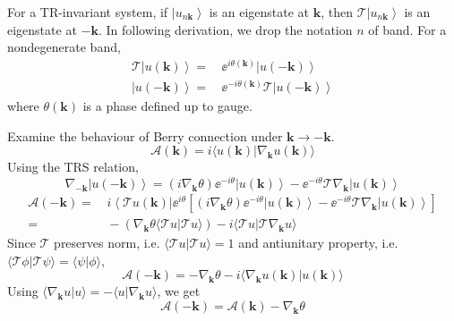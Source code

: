 \documentclass[12pt,a4paper]{article}
\newcommand{\bra}[1]{\left\langle{#1}\right|}
\newcommand{\ket}[1]{\left|{#1}\right\rangle}
\newcommand{\braket}[2]{\langle{#1}|{#2}\rangle}
\begin{document}
    For a TR-invariant system, if $\ket{u_{n\mathbf{k}}}$ is an eigenstate at $\mathbf{k}$, then $\mathcal{T}\ket{u_{n\mathbf{k}}}$ is an eigenstate at $-\mathbf{k}$. In following derivation, we drop the notation $n$ of band. For a nondegenerate band,
    \[\begin{aligned}
        \mathcal{T}\ket{u(\mathbf{k})}
        = &\, \ee^{i\theta(\mathbf{k})} \ket{u(\mathbf{-k})} \\
        \ket{u(\mathbf{-k})}
        = &\, \ee^{-i\theta(\mathbf{k})} \mathcal{T}\ket{u(\mathbf{-k})}
    \end{aligned}\]
    where $\theta(\mathbf{k})$ is a phase defined up to gauge.

    Examine the behaviour of Berry connection under \(\mathbf{k}\to -\mathbf{k}\).
    \[
        \mathcal{A}(\mathbf{k})
        = i \braket{u(\mathbf{k})}{\nabla_\mathbf{k}u(\mathbf{k})}
    \]
    Using the TRS relation,
    \[
        \nabla_{-\mathbf{k}} \ket{u(\mathbf{-k})}
        = \left(i\nabla_\mathbf{k}\theta\right) \ee^{-i\theta}\ket{u(\mathbf{k})}
        - \ee^{-i\theta} \mathcal{T} \nabla_\mathbf{k} \ket{u(\mathbf{k})}
    \]
    \[\begin{aligned}
        \mathcal{A}(-\mathbf{k})
        = &\, i \bra{\mathcal{T}u(\mathbf{k})} \ee^{i\theta}
        \left[
        \left(i\nabla_\mathbf{k}\theta\right) \ee^{-i\theta}\ket{u(\mathbf{k})}
        - \ee^{-i\theta} \mathcal{T} \nabla_\mathbf{k} \ket{u(\mathbf{k})}
        \right] \\
        = &\, - \left(\nabla_\mathbf{k}\theta\braket{\mathcal{T}u}{\mathcal{T}u}\right)
        - i \braket{\mathcal{T}u}{\mathcal{T}\nabla_\mathbf{k}u}
    \end{aligned}\]
    Since $\mathcal{T}$ preserves norm, i.e. $\braket{\mathcal{T}u}{\mathcal{T}u} = 1$ and antiunitary property, i.e. $\braket{\mathcal{T}\phi}{\mathcal{T}\psi} = \braket{\psi}{\phi}$,
    \[
        \mathcal{A}(-\mathbf{k})
        = -\nabla_\mathbf{k}\theta
        - i \braket{\nabla_\mathbf{k}u(\mathbf{k})}{u(\mathbf{k})}
    \]
    Using $\braket{\nabla_\mathbf{k}u}{u} = - \braket{u}{\nabla_\mathbf{k}u}$, we get
    \begin{equation}
    \label{eq:A_TR}
        \mathcal{A}(-\mathbf{k})
        = \mathcal{A}(\mathbf{k})
        - \nabla_\mathbf{k}\theta
    \end{equation}
\end{document}
